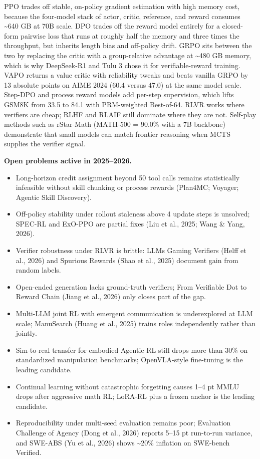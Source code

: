 PPO trades off stable, on-policy gradient estimation with high memory cost, because the four-model stack of actor, critic, reference, and reward consumes \textasciitilde640 GB at 70B scale. DPO trades off the reward model entirely for a closed-form pairwise loss that runs at roughly half the memory and three times the throughput, but inherits length bias and off-policy drift. GRPO sits between the two by replacing the critic with a group-relative advantage at \textasciitilde480 GB memory, which is why DeepSeek-R1 and Tulu 3 chose it for verifiable-reward training. VAPO returns a value critic with reliability tweaks and beats vanilla GRPO by 13 absolute points on AIME 2024 (60.4 versus 47.0) at the same model scale. Step-DPO and process reward models add per-step supervision, which lifts GSM8K from 33.5 to 84.1 with PRM-weighted Best-of-64. RLVR works where verifiers are cheap; RLHF and RLAIF still dominate where they are not. Self-play methods such as rStar-Math (MATH-500 = 90.0\% with a 7B backbone) demonstrate that small models can match frontier reasoning when MCTS supplies the verifier signal.

\textbf{Open problems active in 2025--2026.}

\begin{itemize}
\tightlist
\item
  Long-horizon credit assignment beyond 50 tool calls remains statistically infeasible without skill chunking or process rewards (Plan4MC; Voyager; Agentic Skill Discovery).
\item
  Off-policy stability under rollout staleness above 4 update steps is unsolved; SPEC-RL and ExO-PPO are partial fixes (Liu et al., 2025; Wang \& Yang, 2026).
\item
  Verifier robustness under RLVR is brittle: LLMs Gaming Verifiers (Helff et al., 2026) and Spurious Rewards (Shao et al., 2025) document gain from random labels.
\item
  Open-ended generation lacks ground-truth verifiers; From Verifiable Dot to Reward Chain (Jiang et al., 2026) only closes part of the gap.
\item
  Multi-LLM joint RL with emergent communication is underexplored at LLM scale; ManuSearch (Huang et al., 2025) trains roles independently rather than jointly.
\item
  Sim-to-real transfer for embodied Agentic RL still drops more than 30\% on standardized manipulation benchmarks; OpenVLA-style fine-tuning is the leading candidate.
\item
  Continual learning without catastrophic forgetting causes 1--4 pt MMLU drops after aggressive math RL; LoRA-RL plus a frozen anchor is the leading candidate.
\item
  Reproducibility under multi-seed evaluation remains poor; Evaluation Challenge of Agency (Dong et al., 2026) reports 5--15 pt run-to-run variance, and SWE-ABS (Yu et al., 2026) shows \textasciitilde20\% inflation on SWE-bench Verified.
\end{itemize}

